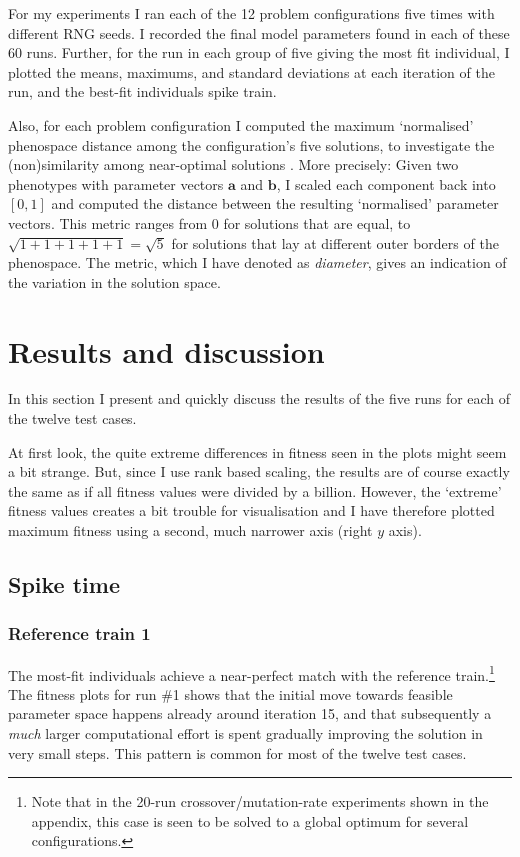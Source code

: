 \documentclass[a4paper,9pt]{article}
\newcommand{\vvec}[1]{\ensuremath{\mathbf{#1}}}
\newcommand{\tightit}{\vspace{-5pt}}
\begin{document}
For my experiments I ran each of the 12 problem configurations five times with
different RNG seeds. I recorded the final model parameters found in each of
these 60 runs. Further, for the run in each group of five giving the most fit
individual, I plotted the means, maximums, and standard deviations at each
iteration of the run, and the best-fit individuals spike train.

Also, for each problem configuration I computed the maximum `normalised'
phenospace distance among the configuration's five solutions, to investigate
the (non)similarity among near-optimal solutions . More precisely: Given two
phenotypes with parameter vectors \vvec{a} and \vvec{b}, I scaled each
component back into $[0, 1]$ and computed the distance between the resulting
`normalised' parameter vectors. This metric ranges from 0 for solutions that
are equal, to $\sqrt{1+1+1+1+1} = \sqrt{5}$ for solutions that lay at different
outer borders of the phenospace. The metric, which I have denoted as
\emph{diameter}, gives an indication of the variation in the solution space. 


\section{Results and discussion}
\tightit \label{sec:results}

In this section I present and quickly discuss the results of the five runs for
each of the twelve test cases.

At first look, the quite extreme differences in fitness seen in the plots
might seem a bit strange. But, since I use rank based scaling, the results
are of course exactly the same as if all fitness values were divided by a
billion. However, the `extreme' fitness values creates a bit trouble for
visualisation and I have therefore plotted maximum fitness using a second, much
narrower axis (right $y$ axis).

\subsection{Spike time}
\tightit

\subsubsection{Reference train 1}
\tightit
The most-fit individuals achieve a near-perfect match with the reference
train.\footnote{Note that in the 20-run crossover/mutation-rate experiments shown in
the appendix, this case is seen to be solved to a global optimum for several
configurations.} The fitness plots for run \#1 shows that the initial move
towards feasible parameter space happens already around iteration 15, and that
subsequently a \emph{much} larger computational effort is spent gradually
improving the solution in very small steps. This pattern is common for most of
the twelve test cases.
\end{document}
